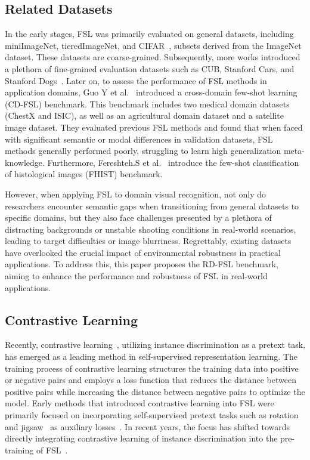 \subsection{Related Datasets}
\label{subsec:related}
In the early stages, FSL was primarily evaluated on general datasets, including miniImageNet, tieredImageNet, and CIFAR~\cite{VinyalsBLKW16, GuoGWFYZG23}, subsets derived from the ImageNet dataset. These datasets are coarse-grained. Subsequently, more works introduced a plethora of fine-grained evaluation datasets such as CUB, Stanford Cars, and Stanford Dogs~\cite{ZhaTST23, HuangZZXW21, TianX23}. 
Later on, to assess the performance of FSL methods in application domains, Guo Y et al.~\cite{GuoCKCSSRF20} introduced a cross-domain few-shot learning (CD-FSL) benchmark. This benchmark includes two medical domain datasets (ChestX and ISIC), as well as an agricultural domain dataset and a satellite image dataset. They evaluated previous FSL methods and found that when faced with significant semantic or modal differences in validation datasets, FSL methods generally performed poorly, struggling to learn high generalization meta-knowledge.
Furthermore, Fereshteh.S et al.~\cite{abs-2206-00092} introduce the few-shot classification of histological images (FHIST) benchmark.

However, when applying FSL to domain visual recognition, not only do researchers encounter semantic gaps when transitioning from general datasets to specific domains, but they also face challenges presented by a plethora of distracting backgrounds or unstable shooting conditions in real-world scenarios, leading to target difficulties or image blurriness.
Regrettably, existing datasets have overlooked the crucial impact of environmental robustness in practical applications. To address this, this paper proposes the RD-FSL benchmark, aiming to enhance the performance and robustness of FSL in real-world applications.

\subsection{Contrastive Learning}
\label{subsec:con}
Recently, contrastive learning~\cite{PengL0LZ0H23, ChenK0H20, HeCXLDG22}, utilizing instance discrimination as a pretext task, has emerged as a leading method in self-supervised representation learning. 
The training process of contrastive learning structures the training data into positive or negative pairs and employs a loss function that reduces the distance between positive pairs while increasing the distance between negative pairs to optimize the model. 
Early methods that introduced contrastive learning into FSL were primarily focused on incorporating self-supervised pretext tasks such as rotation~\cite{GidarisSK18} and jigsaw~\cite{NorooziF16} as auxiliary losses~\cite{GidarisBKPC19, ChenGZHW21}. In recent years, the focus has shifted towards directly integrating contrastive learning of instance discrimination into the pre-training of FSL~\cite{LiuF0YLWZ21, MaXHCGA21, DoerschGZ20, YangWZ22}. 

